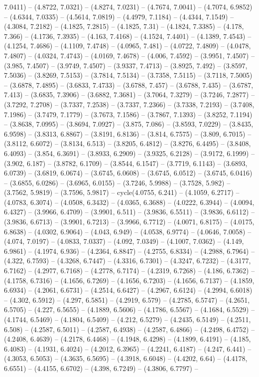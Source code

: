 7.0411) -- (4.8722, 7.0321) -- (4.8274, 7.0231) -- (4.7674, 7.0041) -- (4.7074, 6.9852) -- (4.6344, 7.0335) -- (4.5614, 7.0819) -- (4.4979, 7.1184) -- (4.4344, 7.1549) -- (4.3084, 7.2182) -- (4.1825, 7.2815) -- (4.1825, 7.31) -- (4.1824, 7.3385) -- (4.178, 7.366) -- (4.1736, 7.3935) -- (4.163, 7.4168) -- (4.1524, 7.4401) -- (4.1389, 7.4543) -- (4.1254, 7.4686) -- (4.1109, 7.4748) -- (4.0965, 7.481) -- (4.0722, 7.4809) -- (4.0478, 7.4807) -- (4.0324, 7.4743) -- (4.0169, 7.4678) -- (4.006, 7.4592) -- (3.9951, 7.4507) -- (3.985, 7.4507) -- (3.9749, 7.4507) -- (3.9337, 7.4713) -- (3.8925, 7.492) -- (3.8597, 7.5036) -- (3.8269, 7.5153) -- (3.7814, 7.5134) -- (3.7358, 7.5115) -- (3.7118, 7.5005) -- (3.6878, 7.4895) -- (3.6833, 7.4733) -- (3.6788, 7.457) -- (3.6788, 7.435) -- (3.6787, 7.413) -- (3.6835, 7.3906) -- (3.6882, 7.3681) -- (3.7064, 7.3279) -- (3.7246, 7.2877) -- (3.7292, 7.2708) -- (3.7337, 7.2538) -- (3.7337, 7.2366) -- (3.7338, 7.2193) -- (3.7408, 7.1986) -- (3.7479, 7.1779) -- (3.7673, 7.1586) -- (3.7867, 7.1393) -- (3.8252, 7.1194) -- (3.8638, 7.0995) -- (3.8694, 7.0927) -- (3.875, 7.086) -- (3.8593, 7.0229) -- (3.8435, 6.9598) -- (3.8313, 6.8867) -- (3.8191, 6.8136) -- (3.814, 6.7575) -- (3.809, 6.7015) -- (3.8112, 6.6072) -- (3.8134, 6.513) -- (3.8205, 6.4812) -- (3.8276, 6.4495) -- (3.8408, 6.4093) -- (3.854, 6.3691) -- (3.8933, 6.2909) -- (3.9325, 6.2128) -- (3.9172, 6.1999) -- (3.902, 6.187) -- (3.8782, 6.1709) -- (3.8544, 6.1547) -- (3.7719, 6.1143) -- (3.6893, 6.0739) -- (3.6819, 6.0674) -- (3.6745, 6.0608) -- (3.6745, 6.0512) -- (3.6745, 6.0416) -- (3.6855, 6.0286) -- (3.6965, 6.0155) -- (3.7246, 5.9988) -- (3.7528, 5.982) -- (3.7562, 5.9819) -- (3.7596, 5.9817) -- cycle(4.0755, 6.241) -- (4.1059, 6.2717) -- (4.0783, 6.3074) -- (4.0508, 6.3432) -- (4.0365, 6.3688) -- (4.0222, 6.3944) -- (4.0094, 6.4327) -- (3.9966, 6.4709) -- (3.9901, 6.511) -- (3.9836, 6.5511) -- (3.9836, 6.6112) -- (3.9836, 6.6713) -- (3.9901, 6.7213) -- (3.9966, 6.7712) -- (4.0071, 6.8175) -- (4.0175, 6.8638) -- (4.0302, 6.9064) -- (4.043, 6.949) -- (4.0538, 6.9774) -- (4.0646, 7.0058) -- (4.074, 7.0197) -- (4.0833, 7.0337) -- (4.092, 7.0349) -- (4.1007, 7.0362) -- (4.149, 6.9861) -- (4.1974, 6.936) -- (4.2364, 6.8847) -- (4.2755, 6.8334) -- (4.2988, 6.7964) -- (4.322, 6.7593) -- (4.3268, 6.7447) -- (4.3316, 6.7301) -- (4.3247, 6.7232) -- (4.3177, 6.7162) -- (4.2977, 6.7168) -- (4.2778, 6.7174) -- (4.2319, 6.7268) -- (4.186, 6.7362) -- (4.1758, 6.7316) -- (4.1656, 6.7269) -- (4.1656, 6.7203) -- (4.1656, 6.7137) -- (4.1859, 6.6934) -- (4.2061, 6.6731) -- (4.2514, 6.6427) -- (4.2967, 6.6124) -- (4.2994, 6.6018) -- (4.302, 6.5912) -- (4.297, 6.5851) -- (4.2919, 6.579) -- (4.2785, 6.5747) -- (4.2651, 6.5705) -- (4.227, 6.5655) -- (4.1889, 6.5606) -- (4.1786, 6.5567) -- (4.1684, 6.5529) -- (4.1744, 6.5469) -- (4.1804, 6.5409) -- (4.212, 6.5279) -- (4.2435, 6.5149) -- (4.2511, 6.508) -- (4.2587, 6.5011) -- (4.2587, 6.4938) -- (4.2587, 6.4866) -- (4.2498, 6.4752) -- (4.2408, 6.4639) -- (4.2178, 6.4468) -- (4.1948, 6.4298) -- (4.1899, 6.4191) -- (4.185, 6.4083) -- (4.1931, 6.4024) -- (4.2012, 6.3965) -- (4.2241, 6.4187) -- (4.247, 6.441) -- (4.3053, 6.5053) -- (4.3635, 6.5695) -- (4.3918, 6.6048) -- (4.4202, 6.64) -- (4.4178, 6.6551) -- (4.4155, 6.6702) -- (4.398, 6.7249) -- (4.3806, 6.7797) -- 